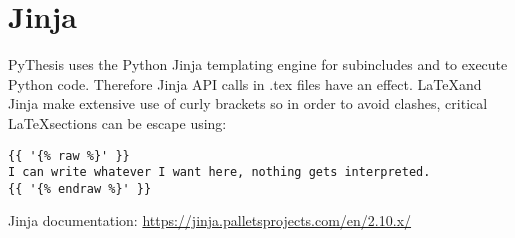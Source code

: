 \section{Jinja}
\label{sec:jinja}
PyThesis uses the Python Jinja templating engine for subincludes and to execute Python code. Therefore Jinja API calls in .tex files have an effect. \LaTeX and Jinja make extensive use of curly brackets so in order to avoid clashes, critical \LaTeX sections can be escape using:
\begin{verbatim}
{{ '{% raw %}' }}
I can write whatever I want here, nothing gets interpreted.
{{ '{% endraw %}' }}
\end{verbatim}

Jinja documentation: \url{https://jinja.palletsprojects.com/en/2.10.x/}
